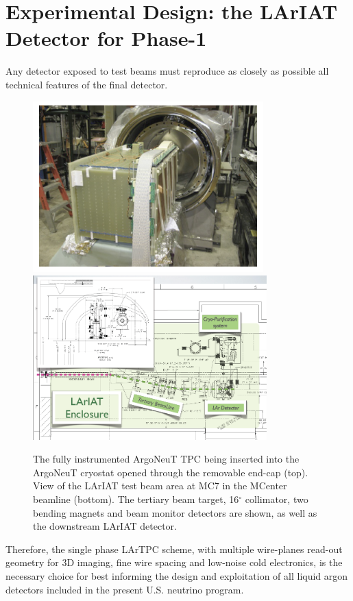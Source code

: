 \documentclass[DIV=calc, paper=a4, fontsize=10pt, twocolumn]{scrartcl}	 %
\begin{document}
{\section{Experimental Design: the {\sf LArIAT} Detector for Phase-1}
\label{sec:detector}
Any detector exposed to test beams must reproduce as closely as possible all technical features of the final detector.
\begin{figure}[h]
\begin{centering}
\includegraphics[height=2.6in]{Figures/tpc_taup.png}  
\includegraphics[height=2.5in]{Figures/MC7-beamline}
\caption{ {\scriptsize The fully instrumented ArgoNeuT TPC being inserted into the {\sf ArgoNeuT} cryostat opened through the removable end-cap (top). View of the LArIAT test beam area at MC7 in the MCenter beamline (bottom). The tertiary beam target, 16$^\circ$ collimator, two bending magnets and beam monitor detectors are shown, as well as the downstream LArIAT detector.}  }
\label{fig:ArgoNeuT-pictures}
\end{centering}
\end{figure}
Therefore, the single phase LArTPC scheme, with multiple wire-planes read-out geometry for 3D imaging, fine wire spacing and low-noise cold electronics, is the necessary choice for best informing the design and exploitation of all liquid argon detectors included in the present U.S. neutrino program.

}
\end{document}
